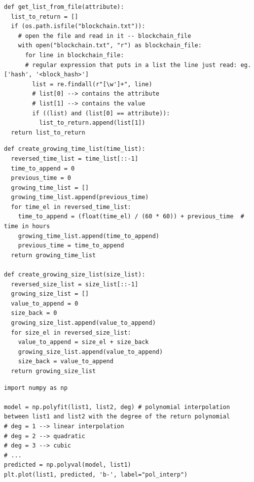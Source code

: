 \documentclass[USenglish]{uit-thesis}
\begin{document}
\begin{appendices}
\begin{lstlisting}[float, caption={Method that allows, given an attribute present in the blockchain.txt file, to create a list containing informations only about this quality using \emph{regular expressions}.}]
def get_list_from_file(attribute):
  list_to_return = []
  if (os.path.isfile("blockchain.txt")):
    # open the file and read in it -- blockchain_file
    with open("blockchain.txt", "r") as blockchain_file:
      for line in blockchain_file:
      # regular expression that puts in a list the line just read: eg. ['hash', '<block_hash>']
        list = re.findall(r"[\w']+", line)
        # list[0] --> contains the attribute
        # list[1] --> contains the value
        if ((list) and (list[0] == attribute)):
          list_to_return.append(list[1])
  return list_to_return
\end{lstlisting}

\begin{lstlisting}[float, caption={Generation of the growing size and time lists. Calculated following the Equations~\ref{eq:growing_size},~\ref{eq:growing_time}.}]
def create_growing_time_list(time_list):
  reversed_time_list = time_list[::-1]
  time_to_append = 0
  previous_time = 0
  growing_time_list = []
  growing_time_list.append(previous_time)
  for time_el in reversed_time_list:
    time_to_append = (float(time_el) / (60 * 60)) + previous_time  # time in hours
    growing_time_list.append(time_to_append)
    previous_time = time_to_append
  return growing_time_list

def create_growing_size_list(size_list):
  reversed_size_list = size_list[::-1]
  growing_size_list = []
  value_to_append = 0
  size_back = 0
  growing_size_list.append(value_to_append)
  for size_el in reversed_size_list:
    value_to_append = size_el + size_back
    growing_size_list.append(value_to_append)
    size_back = value_to_append
  return growing_size_list
\end{lstlisting}

\begin{lstlisting}[float, caption={Example of a polynomial interpolation of two lists using NumPy libraries.}]
import numpy as np

model = np.polyfit(list1, list2, deg) # polynomial interpolation between list1 and list2 with the degree of the return polynomial
# deg = 1 --> linear interpolation
# deg = 2 --> quadratic
# deg = 3 --> cubic
# ...
predicted = np.polyval(model, list1)
plt.plot(list1, predicted, 'b-', label="pol_interp")
\end{lstlisting}


\end{appendices}
\end{document}
